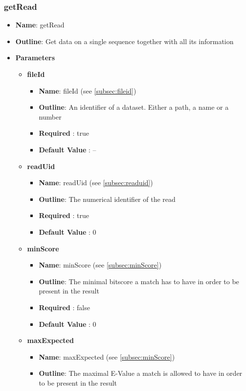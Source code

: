 \documentclass[11pt]{article}
\begin{document}
\subsubsection{getRead}

\begin{itemize}
	\item \textbf{Name}: getRead
	\item \textbf{Outline}: Get data on a single sequence together with all its information
	\item \textbf{Parameters}
		\begin{itemize}
			\item \textbf{fileId}		
				\begin{itemize}
					\item \textbf{Name}: fileId (see \ref{subsec:fileid})
					\item \textbf{Outline}: An identifier of a dataset. Either a path, a name or a number
					\item \textbf{Required} : true
					\item \textbf{Default Value} : --
				\end{itemize}
			\item \textbf{readUid}		
				\begin{itemize}
					\item \textbf{Name}: readUid (see \ref{subsec:readuid}) 
					\item \textbf{Outline}: The numerical identifier of the read
					\item \textbf{Required} : true
					\item \textbf{Default Value} : 0
				\end{itemize}
			\item \textbf{minScore}		
				\begin{itemize}
					\item \textbf{Name}: minScore (see \ref{subsec:minScore})
					\item \textbf{Outline}: The minimal bitscore a match has to have in order to be present in the result
					\item \textbf{Required} : false
					\item \textbf{Default Value} : 0
				\end{itemize}
			\item \textbf{maxExpected}		
				\begin{itemize}
					\item \textbf{Name}: maxExpected (see \ref{subsec:minScore})
					\item \textbf{Outline}: The maximal E-Value a match is allowed to have in order to be present in the result

\end{itemize}
\end{itemize}
\end{itemize}
\end{document}
